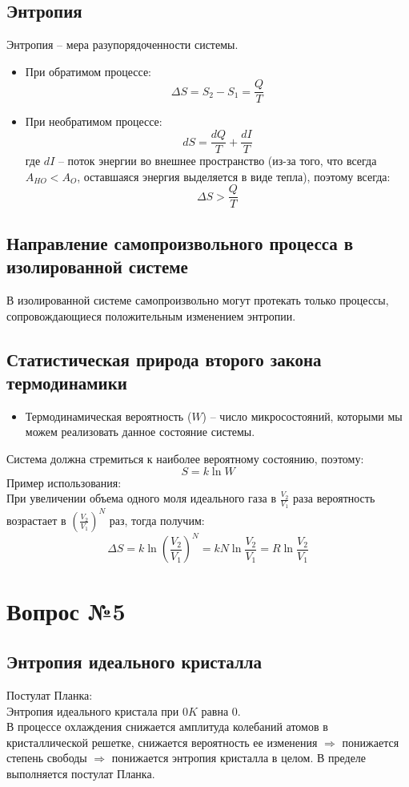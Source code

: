 \documentclass[14pt,a4paper]{scrartcl}
\begin{document}
	\subsection*{Энтропия} 
	Энтропия -- мера разупорядоченности системы.
	\begin{itemize}
		\item При обратимом процессе:
		$$\Delta{S} = S_2 - S_1 = \dfrac{Q}{T} $$ 
		\item При необратимом процессе:
		$$ dS = \dfrac{dQ}{T} + \dfrac{dI}{T} $$
		где $dI$ -- поток энергии во внешнее пространство (из-за того, что всегда $A_{HO} < A_O$, оставшаяся энергия выделяется в виде тепла), поэтому всегда:
		$$ \Delta{S} > \dfrac{Q}{T} $$
	\end{itemize}
	\subsection*{Направление самопроизвольного процесса в изолированной системе} 
	В изолированной системе самопроизвольно могут протекать только процессы, сопровождающиеся положительным изменением энтропии.
	\subsection*{Статистическая природа второго закона термодинамики} 
	\begin{itemize}
		\item Термодинамическая вероятность ($W$) -- число микросостояний, которыми мы можем реализовать данное состояние системы.
		
	\end{itemize}
	Система должна стремиться к наиболее вероятному состоянию, поэтому:
	$$ S = k \ln{W} $$
	Пример использования: \\
	При увеличении объема одного моля идеального газа в $\frac{V_2}{V_1}$ раза вероятность возрастает в $(\frac{V_2}{V_1})^N$ раз, тогда получим:
	$$ \Delta{S} = k \ln{(\frac{V_2}{V_1})^N} = k N \ln{\frac{V_2}{V_1}} = R \ln{\frac{V_2}{V_1}} $$
	
\section*{Вопрос №5}
	
	\subsection*{Энтропия идеального кристалла} 
	Постулат Планка: \\
	Энтропия идеального кристала при $0K$ равна $0$. \\
	В процессе охлаждения снижается амплитуда колебаний атомов в кристаллической решетке, снижается вероятность ее изменения $\Rightarrow$ понижается степень свободы $\Rightarrow$ понижается энтропия кристалла в целом. В пределе выполняется постулат Планка. 
\end{document}
